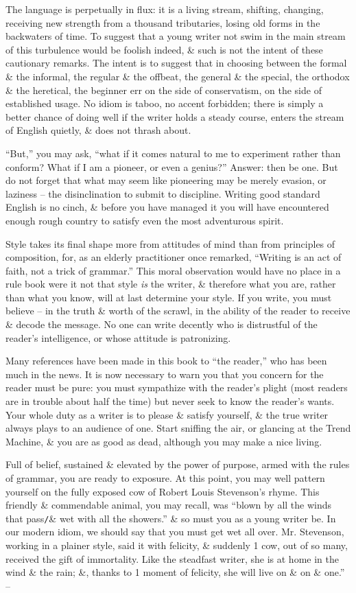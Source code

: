 \documentclass{article}
\begin{document}
The language is perpetually in flux: it is a living stream, shifting, changing, receiving new strength from a thousand tributaries, losing old forms in the backwaters of time. To suggest that a young writer not swim in the main stream of this turbulence would be foolish indeed, \& such is not the intent of these cautionary remarks. The intent is to suggest that in choosing between the formal \& the informal, the regular \& the offbeat, the general \& the special, the orthodox \& the heretical, the beginner err on the side of conservatism, on the side of established usage. No idiom is taboo, no accent forbidden; there is simply a better chance of doing well if the writer holds a steady course, enters the stream of English quietly, \& does not thrash about.

``But,'' you may ask, ``what if it comes natural to me to experiment rather than conform? What if I am a pioneer, or even a genius?'' Answer: then be one. But do not forget that what may seem like pioneering may be merely evasion, or laziness -- the disinclination to submit to discipline. Writing good standard English is no cinch, \& before you have managed it you will have encountered enough rough country to satisfy even the most adventurous spirit.

Style takes its final shape more from attitudes of mind than from principles of composition, for, as an elderly practitioner once remarked, ``Writing is an act of faith, not a trick of grammar.'' This moral observation would have no place in a rule book were it not that style {\it is} the writer, \& therefore what you are, rather than what you know, will at last determine your style. If you write, you must believe -- in the truth \& worth of the scrawl, in the ability of the reader to receive \& decode the message. No one can write decently who is distrustful of the reader's intelligence, or whose attitude is patronizing.

Many references have been made in this book to ``the reader,'' who has been much in the news. It is now necessary to warn you that you concern for the reader must be pure: you must sympathize with the reader's plight (most readers are in trouble about half the time) but never seek to know the reader's wants. Your whole duty as a writer is to please \& satisfy yourself, \& the true writer always plays to an audience of one. Start sniffing the air, or glancing at the Trend Machine, \& you are as good as dead, although you may make a nice living.

Full of belief, sustained \& elevated by the power of purpose, armed with the rules of grammar, you are ready to exposure. At this point, you may well pattern yourself on the fully exposed cow of Robert Louis Stevenson's rhyme. This friendly \& commendable animal, you may recall, was ``blown by all the winds that pass{\tt/}\& wet with all the showers.'' \& so must you as a young writer be. In our modern idiom, we should say that you must get wet all over. Mr. Stevenson, working in a plainer style, said it with felicity, \& suddenly 1 cow, out of so many, received the gift of immortality. Like the steadfast writer, she is at home in the wind \& the rain; \&, thanks to 1 moment of felicity, she will live on \& on \& one.'' -- \cite[pp. 101--103]{Strunk_White_element_style}
\end{document}
